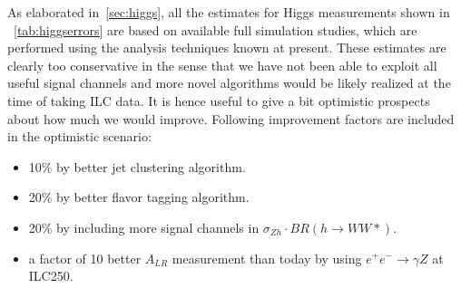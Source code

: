 
As elaborated in~\ref{sec:higgs}, all the estimates for Higgs measurements shown in
~\ref{tab:higgserrors} are based on available full simulation studies, which are performed using the analysis
techniques known at present. These estimates are clearly too conservative in the sense that we have not
been able to exploit all useful signal channels and more novel algorithms would be likely realized at the time
of taking ILC data. It is hence useful to give a bit optimistic prospects about how much we would improve. 
Following improvement factors are included in the optimistic scenario:
\begin{itemize}
\item 10\% by better jet clustering algorithm.
\item 20\% by better flavor tagging algorithm. 
\item 20\% by including more signal channels in $\sigma_{Zh}\cdot BR(h\to WW*)$. 
\item a factor of 10 better $A_{LR}$ measurement than today by using $e^+e^-\to\gamma Z$ at ILC250.
\end{itemize}